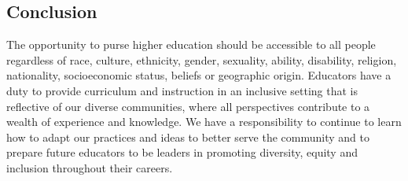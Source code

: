 \documentclass[11pt]{article}
\begin{document}
\subsection*{Conclusion}

The opportunity to purse higher education should be accessible to all people regardless of race, culture, ethnicity, gender, sexuality, ability, disability, religion, nationality, socioeconomic status, beliefs or geographic origin. Educators have a duty to provide curriculum and instruction in an inclusive setting that is reflective of our diverse communities, where all perspectives contribute to a wealth of experience and knowledge. We have a responsibility to continue to learn how to adapt our practices and ideas to better serve the community and to prepare future educators to be leaders in promoting diversity, equity and inclusion throughout their careers. 
\end{document}

